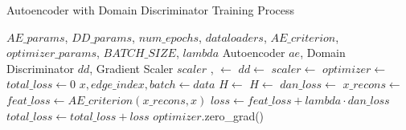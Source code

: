 \begin{algorithm}
\caption{Autoencoder with Domain Discriminator Training Process }
\label{alg:ae}
\begin{algorithmic}[1]
\Require $AE\_params$, $DD\_params$, $num\_epochs$, $dataloaders$, $AE\_criterion$, $optimizer\_params$, $BATCH\_SIZE$, $lambda$
\Ensure Autoencoder $ae$, Domain Discriminator $dd$, Gradient Scaler $scaler$
\State {},  $ \gets$ 
\State $dd \gets$ 
\State $scaler \gets$ 
\State $optimizer \gets$ 
	 
        \State $total\_loss \gets 0$
          
            \State $x, edge\_index, batch \gets data$
            \State $H \gets$ 
	\State $H \gets$ 
            \State $dan\_loss \gets$ 
            \State $x\_recons \gets$ 
            \State $feat\_loss \gets AE\_criterion(x\_recons, x)$
            \State $loss \gets feat\_loss  + lambda \cdot dan\_loss$
            \State $total\_loss \gets total\_loss + loss$
        \EndFor
        \State {}
        \State {}
        \State {}
        \State $optimizer$.zero\_grad()
        \EndFor
    \EndFor
\EndFor
\end{algorithmic}
\end{algorithm}



